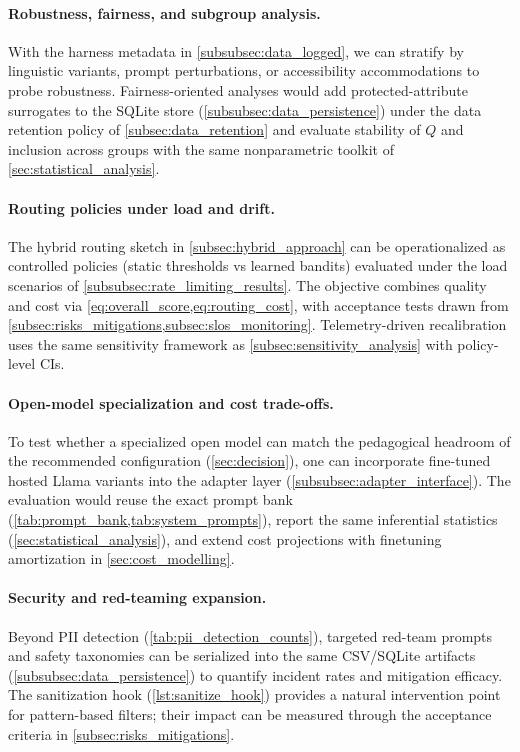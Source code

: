 \paragraph{Robustness, fairness, and subgroup analysis.} With the harness metadata in \cref{subsubsec:data_logged}, we can stratify by linguistic variants, prompt perturbations, or accessibility accommodations to probe robustness. Fairness-oriented analyses would add protected-attribute surrogates to the SQLite store (\cref{subsubsec:data_persistence}) under the data retention policy of \cref{subsec:data_retention} and evaluate stability of $Q$ and inclusion across groups with the same nonparametric toolkit of \cref{sec:statistical_analysis}.

\paragraph{Routing policies under load and drift.} The hybrid routing sketch in \cref{subsec:hybrid_approach} can be operationalized as controlled policies (static thresholds vs learned bandits) evaluated under the load scenarios of \cref{subsubsec:rate_limiting_results}. The objective combines quality and cost via \cref{eq:overall_score,eq:routing_cost}, with acceptance tests drawn from \cref{subsec:risks_mitigations,subsec:slos_monitoring}. Telemetry-driven recalibration uses the same sensitivity framework as \cref{subsec:sensitivity_analysis} with policy-level CIs.

\paragraph{Open-model specialization and cost trade-offs.} To test whether a specialized open model can match the pedagogical headroom of the recommended configuration (\cref{sec:decision}), one can incorporate fine-tuned hosted Llama variants into the adapter layer (\cref{subsubsec:adapter_interface}). The evaluation would reuse the exact prompt bank (\cref{tab:prompt_bank,tab:system_prompts}), report the same inferential statistics (\cref{sec:statistical_analysis}), and extend cost projections with finetuning amortization in \cref{sec:cost_modelling}.

\paragraph{Security and red-teaming expansion.} Beyond PII detection (\cref{tab:pii_detection_counts}), targeted red-team prompts and safety taxonomies can be serialized into the same CSV/SQLite artifacts (\cref{subsubsec:data_persistence}) to quantify incident rates and mitigation efficacy. The sanitization hook (\cref{lst:sanitize_hook}) provides a natural intervention point for pattern-based filters; their impact can be measured through the acceptance criteria in \cref{subsec:risks_mitigations}.

